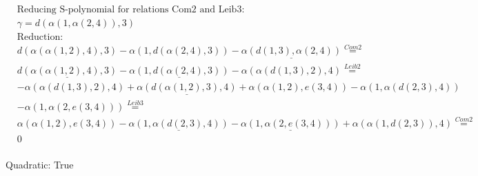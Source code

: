 \documentclass[11pt]{amsart}
\begin{document}
\begin{align*} 
& \text{Reducing S-polynomial for relations Com2 and Leib3:} \\ 
& \gamma = d(\alpha(1,\alpha(2,4)),3) \\ 
& \text{Reduction}: \\&d(\alpha(\alpha(1,2),4),3) - \alpha(1,d(\alpha(2,4),3)) - \underline{\alpha(d(1,3),\alpha(2,4))} \stackrel{ Com2 }{=}  \\ 
&\underline{d(\alpha(\alpha(1,2),4),3)} - \underline{\alpha(1,d(\alpha(2,4),3))} - \alpha(\alpha(d(1,3),2),4) \stackrel{ Leib2 }{=}  \\ 
& - \alpha(\alpha(d(1,3),2),4) + \underline{\alpha(d(\alpha(1,2),3),4)} + \alpha(\alpha(1,2),e(3,4)) - \alpha(1,\alpha(d(2,3),4))\\ 
 &  - \alpha(1,\alpha(2,e(3,4))) \stackrel{ Leib3 }{=}  \\ 
&\alpha(\alpha(1,2),e(3,4)) - \underline{\alpha(1,\alpha(d(2,3),4))} - \underline{\alpha(1,\alpha(2,e(3,4)))} + \alpha(\alpha(1,d(2,3)),4) \stackrel{ Com2 }{=}  \\ 
&0\\ 
\end{align*} 
 

 Quadratic: True
 
\end{document}
